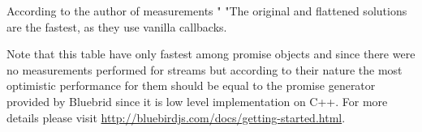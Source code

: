 According to the author of measurements \cite{asyncPerformance_2} "\cite{asyncPerformance} "The original and flattened solutions are the fastest, as they use vanilla callbacks.

Note that this table have only fastest among promise objects and since there were no measurements performed for streams but according to their nature the most optimistic performance for them should be equal to the promise generator provided by Bluebrid since it is low level implementation on C++. For more details please visit \url{http://bluebirdjs.com/docs/getting-started.html}.



